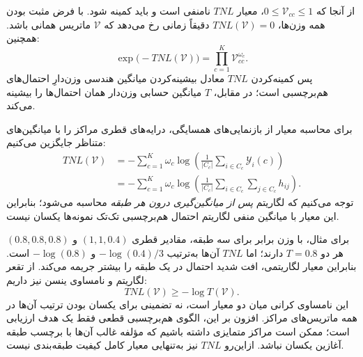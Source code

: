 از آنجا که $0\le\mathcal V_{cc}\le1$، معیار $TNL$ نامنفی است و باید کمینه شود. با فرض مثبت بودن همه وزن‌ها، $TNL(\mathcal V)=0$ دقیقاً زمانی رخ می‌دهد که $\mathcal V$ ماتریس همانی باشد. همچنین:
\begin{equation}\label{cmp:eq:ch3-TNL-geometric-mean}
\boxed{\exp\!\bigl(-TNL(\mathcal V)\bigr)
=\prod_{c=1}^{K}\mathcal V_{cc}^{\omega_c}.}
\end{equation}
پس کمینه‌کردن $TNL$ معادل بیشینه‌کردن میانگین هندسی وزن‌دارِ احتمال‌های هم‌برچسبی است؛ در مقابل، $T$ میانگین حسابی وزن‌دار همان احتمال‌ها را بیشینه می‌کند.

برای محاسبه معیار از بازنمایی‌های همسایگی، درایه‌های قطری مراکز را با میانگین‌های متناظر جایگزین می‌کنیم:
\begin{equation}\label{cmp:eq:ch3-TNL-on-Y-H}
\begin{aligned}
TNL(\mathcal V)
&=-\sum_{c=1}^{K}\omega_c\log
\left(\frac{1}{|C_c|}
\sum_{i\in C_c}\mathscr Y_i(c)\right)\\
&=-\sum_{c=1}^{K}\omega_c\log
\left(\frac{1}{|C_c|}
\sum_{i\in C_c}\sum_{j\in C_c}h_{ij}\right).
\end{aligned}
\end{equation}
توجه می‌کنیم که لگاریتم \emph{پس از میانگین‌گیری درون هر طبقه} محاسبه می‌شود؛ بنابراین این معیار با میانگین منفی لگاریتم احتمال هم‌برچسبی تک‌تک نمونه‌ها یکسان نیست.

برای مثال، با وزن برابر برای سه طبقه، مقادیر قطری $(1,1,0.4)$ و $(0.8,0.8,0.8)$ هر دو $T=0.8$ دارند؛ اما $TNL$ آن‌ها به‌ترتیب $-\log(0.4)/3$ و $-\log(0.8)$ است. بنابراین معیار لگاریتمی، افت شدید احتمال در یک طبقه را بیشتر جریمه می‌کند. از تقعر لگاریتم و نامساوی ینسن نیز داریم:
\begin{equation}\label{cmp:eq:ch3-TNL-Jensen}
\boxed{TNL(\mathcal V)\ge-\log T(\mathcal V).}
\end{equation}
این نامساوی کرانی میان دو معیار است، نه تضمینی برای یکسان بودن ترتیب آن‌ها در همه ماتریس‌های مراکز. افزون بر این، الگوی هم‌برچسبی قطعی فقط یک هدف ارزیابی است؛ ممکن است مراکز متمایزی داشته باشیم که مؤلفه غالب آن‌ها با برچسب طبقه آغازین یکسان نباشد. ازاین‌رو $TNL$ نیز به‌تنهایی معیار کامل کیفیت طبقه‌بندی نیست.

